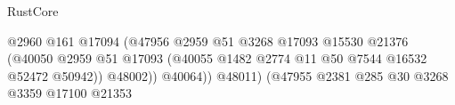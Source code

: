 \begin{lexlean}{RustCore}
\begin{coremodule}
                                                                      @2960
                                                                      @161
                                                                      @17094
                                                                      (@47956
                                                                        @2959
                                                                        @51
                                                                        @3268
                                                                        @17093
                                                                        @15530
                                                                        @21376
                                                                        (@40050
                                                                          @2959
                                                                          @51
                                                                          @17093
                                                                          (@40055
                                                                            @1482
                                                                            @2774
                                                                            @11
                                                                            @50
                                                                            @7544
                                                                            @16532
                                                                            @52472
                                                                            @50942))
                                                                        @48002))
                                                                    @40064))
                                                                @48011)
                                                              (@47955
                                                                @2381
                                                                @285
                                                                @30
                                                                @3268
                                                                @3359
                                                                @17100
                                                                @21353

\end{coremodule}
\end{lexlean}
